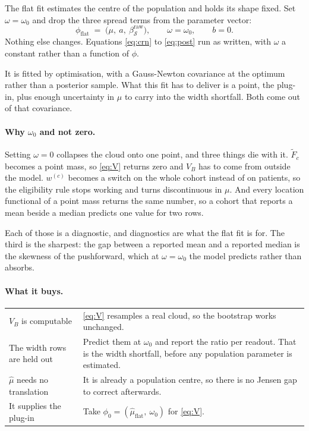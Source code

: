 \documentclass[11pt]{article}
\begin{document}
The flat fit estimates the centre of the population and holds its shape fixed.
Set $\omega=\omega_0$ and drop the three spread terms from the parameter vector:
\begin{equation}
\phi_{\text{flat}} \;=\;
\big(\mu,\ a,\ \beta^{\text{raw}}_{\mathcal{S}}\big),
\qquad
\omega=\omega_0,
\qquad
b=0 .
\label{eq:phiflat}
\end{equation}
Nothing else changes. Equations \eqref{eq:crn} to \eqref{eq:post} run as
written, with $\omega$ a constant rather than a function of $\phi$.

It is fitted by optimisation, with a Gauss-Newton covariance at the optimum
rather than a posterior sample. What this fit has to deliver is a point, the
plug-in, plus enough uncertainty in $\mu$ to carry into the width shortfall.
Both come out of that covariance.

\paragraph{Why $\omega_0$ and not zero.} Setting $\omega=0$ collapses the cloud
onto one point, and three things die with it. $\tilde F_c$ becomes a point mass,
so \eqref{eq:V} returns zero and $V_B$ has to come from outside the model.
$w^{(c)}$ becomes a switch on the whole cohort instead of on patients, so the
eligibility rule stops working and turns discontinuous in $\mu$. And every
location functional of a point mass returns the same number, so a cohort that
reports a mean beside a median predicts one value for two rows.

Each of those is a diagnostic, and diagnostics are what the flat fit is for. The
third is the sharpest: the gap between a reported mean and a reported median is
the skewness of the pushforward, which at $\omega=\omega_0$ the model predicts
rather than absorbs.

\paragraph{What it buys.}

\begin{center}\small
\begin{tabularx}{\textwidth}{@{}lX@{}}
\toprule
$V_B$ is computable & \eqref{eq:V} resamples a real cloud, so the bootstrap works unchanged. \\
The width rows are held out & Predict them at $\omega_0$ and report the ratio per readout. That is the width shortfall, before any population parameter is estimated. \\
$\hat\mu$ needs no translation & It is already a population centre, so there is no Jensen gap to correct afterwards. \\
It supplies the plug-in & Take $\phi_0=(\hat\mu_{\text{flat}},\ \omega_0)$ for \eqref{eq:V}. \\
\bottomrule
\end{tabularx}
\end{center}
\end{document}
